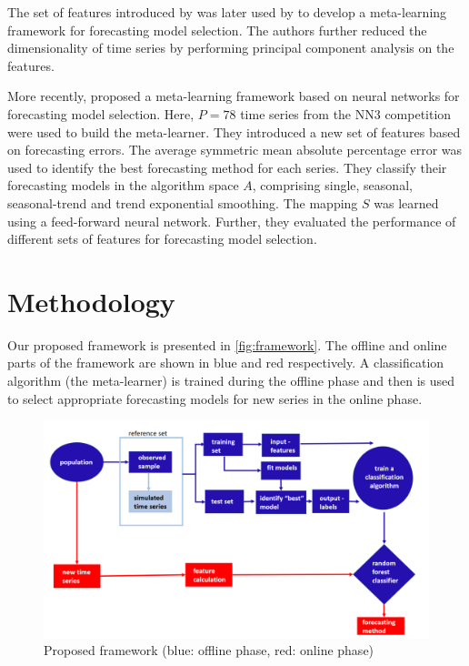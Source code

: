 \documentclass[11pt,a4paper,]{article}
\theoremstyle{definition}
\theoremstyle{definition}
\theoremstyle{definition}
\theoremstyle{remark}
\begin{document}
The set of features introduced by \textcite{wang2009rule} was later used
by \textcite{widodomodel} to develop a meta-learning framework for
forecasting model selection. The authors further reduced the
dimensionality of time series by performing principal component analysis
on the features.

More recently, \textcite{kuck2016meta} proposed a meta-learning
framework based on neural networks for forecasting model selection.
Here, \(P = 78\) time series from the NN3 competition were used to build
the meta-learner. They introduced a new set of features based on
forecasting errors. The average symmetric mean absolute percentage error
was used to identify the best forecasting method for each series. They
classify their forecasting models in the algorithm space \(A\),
comprising single, seasonal, seasonal-trend and trend exponential
smoothing. The mapping \(S\) was learned using a feed-forward neural
network. Further, they evaluated the performance of different sets of
features for forecasting model selection.

\section{Methodology}\label{methodology}

Our proposed framework is presented in \autoref{fig:framework}. The
offline and online parts of the framework are shown in blue and red
respectively. A classification algorithm (the meta-learner) is trained
during the offline phase and then is used to select appropriate
forecasting models for new series in the online phase.

\begin{figure}

{\centering \includegraphics[width=\textwidth]{figures/framework} 

}

\caption{Proposed framework (blue: offline phase, red: online phase)}\label{fig:framework}
\end{figure}
\end{document}
